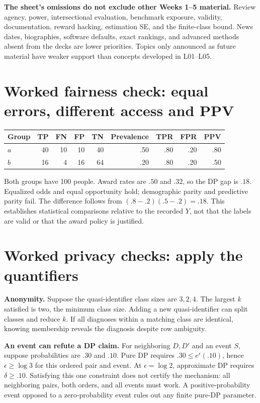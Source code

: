 \documentclass[11pt,letterpaper]{article}
\begin{document}
\textbf{The sheet's omissions do not exclude other Weeks 1--5 material.}
Review agency, power, intersectional evaluation, benchmark exposure, validity,
documentation, reward hacking, estimation SE, and the finite-class bound.
News dates, biographies, software defaults, exact rankings, and advanced methods
absent from the decks are lower priorities. Topics only announced as future
material have weaker support than concepts developed in L01--L05.

\section*{Worked fairness check: equal errors, different access and PPV}
\begin{center}
\small
\begin{tabular}{@{}lrrrrrrrr@{}}
\toprule
Group & TP & FN & FP & TN & Prevalence & TPR & FPR & PPV \\
\midrule
$a$ & 40 & 10 & 10 & 40 & .50 & .80 & .20 & .80 \\
$b$ & 16 & 4 & 16 & 64 & .20 & .80 & .20 & .50 \\
\bottomrule
\end{tabular}
\end{center}
Both groups have 100 people. Award rates are $.50$ and $.32$, so the DP gap is
$.18$. Equalized odds and equal opportunity hold; demographic parity and predictive
parity fail. The difference follows from $(.8-.2)(.5-.2)=.18$.
This establishes statistical comparisons relative to the recorded $Y$, not that
the labels are valid or that the award policy is justified.

\newpage
\section*{Worked privacy checks: apply the quantifiers}
\textbf{Anonymity.} Suppose the quasi-identifier class sizes are $3,2,4$.
The largest $k$ satisfied is two, the minimum class size. Adding a new
quasi-identifier can split classes and reduce $k$. If all diagnoses within a
matching class are identical, knowing membership reveals the diagnosis despite
row ambiguity.

\textbf{An event can refute a DP claim.} For neighboring $D,D'$ and an event
$S$, suppose probabilities are $.30$ and $.10$. Pure DP requires
$.30\le e^\epsilon(.10)$, hence $\epsilon\ge\log 3$ for this ordered pair
and event. At $\epsilon=\log2$, approximate DP requires $\delta\ge.10$.
Satisfying this one constraint does not certify the mechanism: all neighboring
pairs, both orders, and all events must work. A positive-probability event
opposed to a zero-probability event rules out any finite pure-DP parameter.
\end{document}
